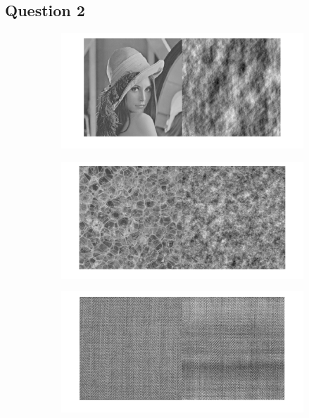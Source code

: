\documentclass[12pt,a4paper,onecolumn]{article}
\begin{document}
\subsection{Question 2}

\begin{figure}
	\centering
	\begin{subfigure}[b]{\textwidth}
		\centering
		\includegraphics[height = 0.20\textheight]{10_2_lena}
		\label{10_2_lena}
	\end{subfigure}
	\begin{subfigure}[b]{\textwidth}
		\centering
		\includegraphics[height = 0.20\textheight]{10_2_bulles}
		\label{10_2_bulles}
	\end{subfigure}
	\begin{subfigure}[b]{\textwidth}
		\centering
		\includegraphics[height = 0.20\textheight]{10_2_tissu}

\end{subfigure}
\end{figure}
\end{document}
